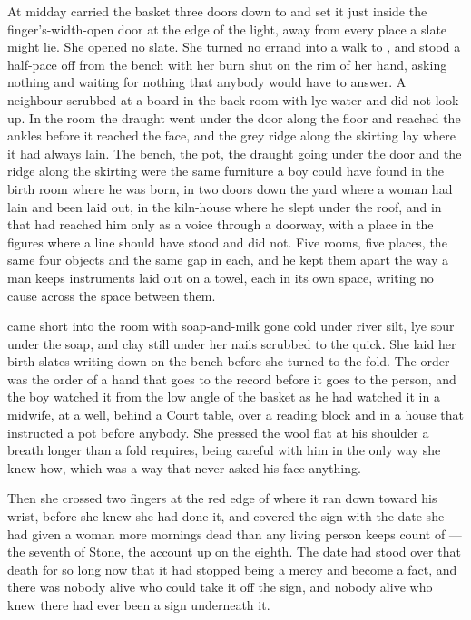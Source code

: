 \scenebreak

At midday  carried the basket three doors down to  and set it just inside the finger's-width-open door at the edge of the light, away from every place a slate might lie. She opened no slate. She turned no errand into a walk to , and stood a half-pace off from the bench with her burn shut on the rim of her hand, asking nothing and waiting for nothing that anybody would have to answer. A neighbour scrubbed at a board in the back room with lye water and did not look up. In the room the draught went under the door along the floor and reached the ankles before it reached the face, and the grey ridge along the skirting lay where it had always lain. The bench, the pot, the draught going under the door and the ridge along the skirting were the same furniture a boy could have found in the birth room where he was born, in  two doors down the yard where a woman had lain and been laid out, in the kiln-house where he slept under the roof, and in  that had reached him only as a voice through a doorway, with a place in the figures where a line should have stood and did not. Five rooms, five places, the same four objects and the same gap in each, and he kept them apart the way a man keeps instruments laid out on a towel, each in its own space, writing no cause across the space between them.

 came short into the room with soap-and-milk gone cold under river silt, lye sour under the soap, and clay still under her nails scrubbed to the quick. She laid her birth-slates writing-down on the bench before she turned to the fold. The order was the order of a hand that goes to the record before it goes to the person, and the boy watched it from the low angle of the basket as he had watched it in a midwife, at a well, behind a Court table, over a reading block and in a house that instructed a pot before anybody. She pressed the wool flat at his shoulder a breath longer than a fold requires, being careful with him in the only way she knew how, which was a way that never asked his face anything.

Then she crossed two fingers at the red edge of  where it ran down toward his wrist, before she knew she had done it, and covered the sign with the date she had given a woman more mornings dead than any living person keeps count of --- the seventh of Stone, the account up on the eighth. The date had stood over that death for so long now that it had stopped being a mercy and become a fact, and there was nobody alive who could take it off the sign, and nobody alive who knew there had ever been a sign underneath it.

